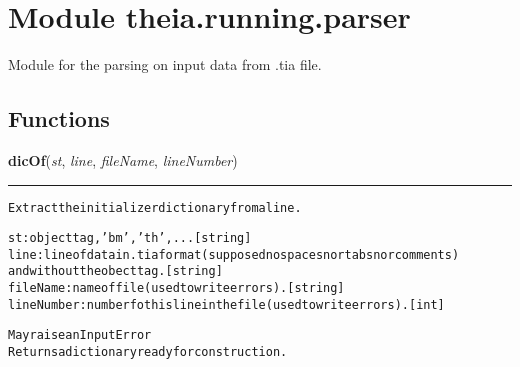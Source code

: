 %
%
%


\section{Module theia.running.parser}

    \label{theia:running:parser}
Module for the parsing on input data from .tia file.



  \subsection{Functions}

    \label{theia:running:parser:dicOf}

    \vspace{0.5ex}

\hspace{.8\funcindent}\begin{boxedminipage}{\funcwidth}

    \raggedright \textbf{dicOf}(\textit{st}, \textit{line}, \textit{fileName}, \textit{lineNumber})

    \vspace{-1.5ex}

    \rule{\textwidth}{0.5\fboxrule}
\setlength{\parskip}{2ex}
\begin{alltt}
Extract the initializer dictionary from a line.

st: object tag, 'bm', 'th', ... [string]
line: line of data in .tia format (supposed no spaces nor tabs nor comments)
and without the obect tag. [string]
fileName: name of file (used to write errors). [string]
lineNumber: number fo this line in the file (used to write errors). [int]

    May raise an InputError
    Returns a dictionary ready for construction.
\end{alltt}

\setlength{\parskip}{1ex}
    \end{boxedminipage}

